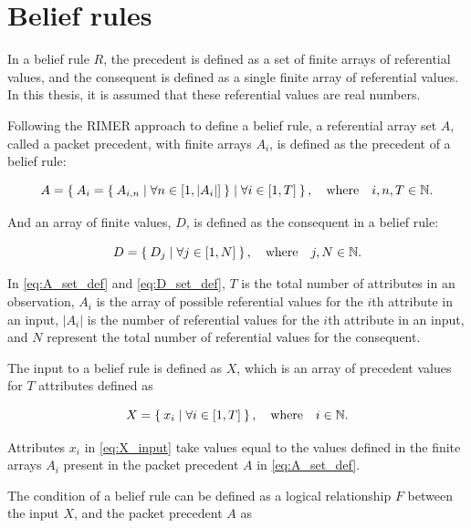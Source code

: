 \section{Belief rules}
\label{belifrules}
In a belief rule $R$, the precedent is defined as a set of finite arrays of referential values, and the consequent
is defined as a single finite array of referential values. In this thesis, it is assumed that these referential values
are real numbers.

Following the RIMER approach \cite{rimer2006} to define a belief rule,
a referential array set $A$, called a packet precedent, with finite arrays $A_i$, is defined as the precedent of a 
belief rule:

\begin{equation}
\label{eq:A_set_def}
    A = \Set{ A_i = \Set{A_{i, n} \mid \forall n \in \left[1, \left|A_i\right| \right]}
    \mid \forall i \in \left[1, T \right] }, \quad\text{where}\quad i, n, T \in \mathbb{N}.
\end{equation}

And an array of finite values, $D$, is defined as the consequent in a belief rule:

\begin{equation}
\label{eq:D_set_def}
    D = \Set{D_j \mid \forall j \in \left[1, N \right] }, \quad\text{where}\quad j, N \in \mathbb{N}.
\end{equation}

In \eqref{eq:A_set_def} and \eqref{eq:D_set_def}, $T$ is the total number of attributes in an observation, $A_i$ is the array of possible  referential values
for the $i$th attribute in an input, $\left|A_i\right|$ is the number of referential values for the $i$th attribute in an input,
and $N$ represent the total number of referential values for the consequent.

The input to a belief rule is defined as $X$, which is an array of precedent values
for $T$ attributes defined as

\begin{equation}
    \label{eq:X_input}
    X = \Set{ x_i \mid \forall i \in \left[1, T \right]}, \quad\text{where}\quad i \in \mathbb{N}.
\end{equation}

Attributes $x_i$ in \eqref{eq:X_input} take values equal to the values defined in
the finite arrays $A_i$ present in the packet precedent $A$ in \eqref{eq:A_set_def}.

The condition of a belief rule can be defined as a logical relationship $F$ between the input $X$, and
the packet precedent $A$ as

